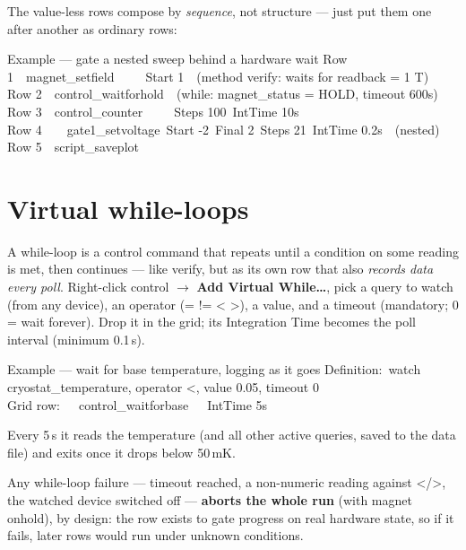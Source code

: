 \documentclass[11pt,a4paper]{article}
\newcommand{\code}[1]{{\ttfamily\color{qcode}#1}}
\begin{document}
\noindent The value-less rows compose by \emph{sequence}, not structure ---
just put them one after another as ordinary rows:

\begin{gridex}{Example --- gate a nested sweep behind a hardware wait}
Row 1\ \ magnet\_setfield\ \ \ \ \ Start 1\ \ (method verify: waits for readback = 1 T)\\
Row 2\ \ control\_waitforhold\ \ (while: magnet\_status = HOLD, timeout 600s)\\
Row 3\ \ control\_counter\ \ \ \ \ Steps 100\ IntTime 10s\\
Row 4\ \ \ \ gate1\_setvoltage\ Start -2\ Final 2\ Steps 21\ IntTime 0.2s\ \ (nested)\\
Row 5\ \ script\_saveplot
\end{gridex}

\section{Virtual while-loops}\label{sec:while}

A while-loop is a \code{control} command that repeats until a condition on
some reading is met, then continues --- like verify, but as its own row that
also \emph{records data every poll}. Right-click \code{control}
$\rightarrow$ \textbf{Add Virtual While\ldots}, pick a query to watch (from
any device), an operator (\code{= != < >}), a value, and a timeout
(mandatory; \code{0} = wait forever). Drop it in the grid; its Integration
Time becomes the poll interval (minimum 0.1\,s).

\begin{gridex}{Example --- wait for base temperature, logging as it goes}
Definition:\ watch cryostat\_temperature, operator <, value 0.05, timeout 0\\
Grid row:\ \ \ control\_waitforbase\ \ \ IntTime 5s
\end{gridex}

\noindent Every 5\,s it reads the temperature (and all other active
queries, saved to the data file) and exits once it drops below 50\,mK.

\begin{warn}
Any while-loop failure --- timeout reached, a non-numeric reading against
\code{<}/\code{>}, the watched device switched off --- \textbf{aborts the whole
run} (with magnet onhold), by design: the row exists to gate progress on real
hardware state, so if it fails, later rows would run under unknown conditions.
\end{warn}
\end{document}
